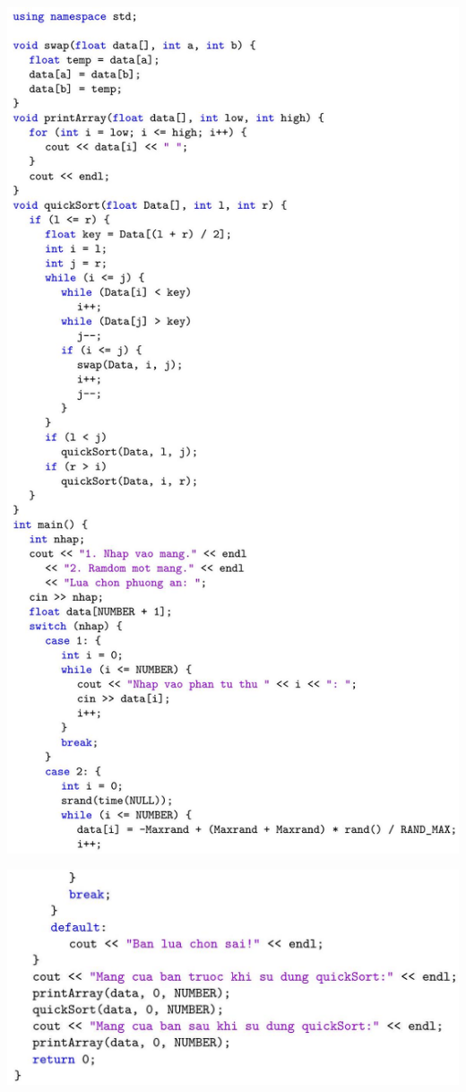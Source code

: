 \documentclass[a4paper]{article}
\begin{document}
\begin{center}
\includegraphics[max width=\textwidth]{2023_12_26_b6dd10aae82b8bc52f5bg-6}
\end{center}

\begin{center}
\includegraphics[max width=\textwidth]{2023_12_26_b6dd10aae82b8bc52f5bg-7}
\end{center}
\end{document}
